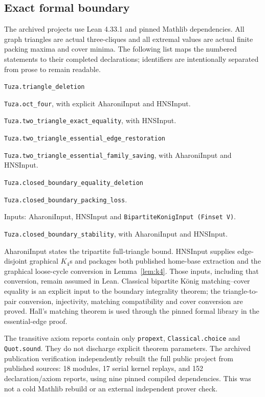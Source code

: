 \documentclass[11pt]{article}
\theoremstyle{definition}\newtheorem{definition}[theorem]{Definition}
\theoremstyle{remark}\newtheorem{remark}[theorem]{Remark}
\begin{document}
\subsection{Exact formal boundary}
The archived projects use Lean 4.33.1 and pinned Mathlib dependencies. All graph triangles are actual three-cliques and all extremal values are actual finite packing maxima and cover minima. The following list maps the numbered statements to their completed declarations; identifiers are intentionally separated from prose to remain readable.
\begin{description}[style=nextline,leftmargin=1.5em]
\item[Theorem~\ref{thm:main} and Corollary~\ref{cor:oct}.] \texttt{Tuza.triangle\_deletion}\par\texttt{Tuza.oct\_four}, with explicit AharoniInput and HNSInput.
\item[Theorem~\ref{thm:exact}.] \texttt{Tuza.two\_triangle\_exact\_equality}, with HNSInput.
\item[Theorem~\ref{thm:essential}.] \texttt{Tuza.two\_triangle\_essential\_edge\_restoration}\par\texttt{Tuza.two\_triangle\_essential\_family\_saving}, with AharoniInput and HNSInput.
\item[Theorem~\ref{thm:boundary}.] \texttt{Tuza.closed\_boundary\_equality\_deletion}\par\texttt{Tuza.closed\_boundary\_packing\_loss}.\par Inputs: AharoniInput, HNSInput and \texttt{BipartiteKonigInput (Finset V)}.
\item[Theorem~\ref{thm:stability}.] \texttt{Tuza.closed\_boundary\_stability}, with AharoniInput and HNSInput.
\end{description}
AharoniInput states the tripartite full-triangle bound. HNSInput supplies edge-disjoint graphical $K_4$s and packages both published home-base extraction and the graphical loose-cycle conversion in Lemma~\ref{lem:k4}. Those inputs, including that conversion, remain assumed in Lean. Classical bipartite K\"onig matching--cover equality \cite{Konig} is an explicit input to the boundary integrality theorem; the triangle-to-pair conversion, injectivity, matching compatibility and cover conversion are proved. Hall's matching theorem \cite{Hall} is used through the pinned formal library in the essential-edge proof.

The transitive axiom reports contain only \texttt{propext}, \texttt{Classical.choice} and \texttt{Quot.sound}. They do not discharge explicit theorem parameters. The archived publication verification independently rebuilt the full public project from published sources: 18 modules, 17 serial kernel replays, and 152 declaration/axiom reports, using nine pinned compiled dependencies. This was not a cold Mathlib rebuild or an external independent prover check.
\end{document}
